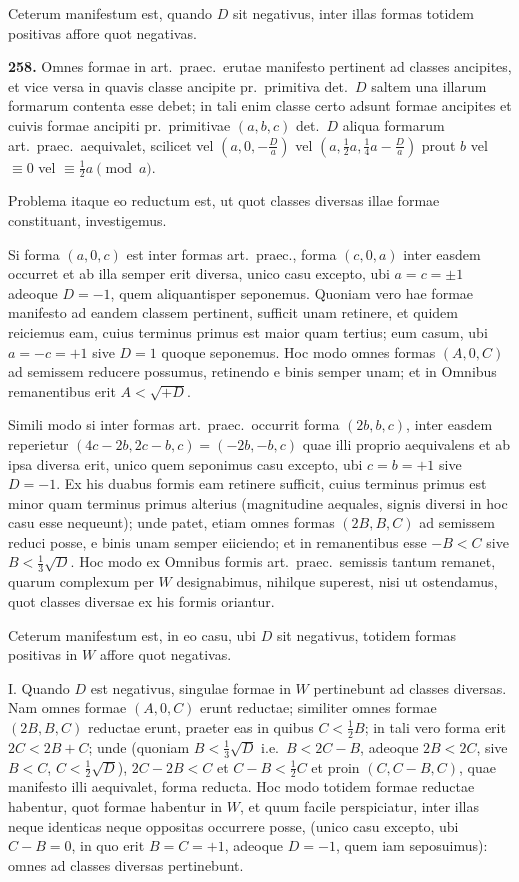 \documentclass[12pt,a4paper]{article}
\theoremstyle{plain}
\theoremstyle{definition}
\theoremstyle{remark}
\theoremstyle{problemstyle}
\begin{document}
Ceterum manifestum est, quando $D$ sit negativus, inter illas formas totidem positivas affore quot negativas.


\textbf{258.} Omnes formae in art.\ praec.\ erutae manifesto pertinent ad classes ancipites, et vice versa in quavis classe ancipite pr.\ primitiva det.\ $D$ saltem una illarum formarum contenta esse debet; in tali enim classe certo adsunt formae ancipites et cuivis formae ancipiti pr.\ primitivae $(a, b, c)$ det.\ $D$ aliqua formarum art.\ praec.\ aequivalet, scilicet vel $(a, 0, -\frac{D}{a})$ vel $(a, \tfrac{1}{2}a, \tfrac{1}{4}a - \frac{D}{a})$ prout $b$ vel $\equiv 0$ vel $\equiv \tfrac{1}{2}a \pmod{a}$.

Problema itaque eo reductum est, ut quot classes diversas illae formae constituant, investigemus.

Si forma $(a, 0, c)$ est inter formas art.\ praec., forma $(c, 0, a)$ inter easdem occurret et ab illa semper erit diversa, unico casu excepto, ubi $a = c = \pm 1$ adeoque $D = -1$, quem aliquantisper seponemus. Quoniam vero hae formae manifesto ad eandem classem pertinent, sufficit unam retinere, et quidem reiciemus eam, cuius terminus primus est maior quam tertius; eum casum, ubi $a = -c = +1$ sive $D = 1$ quoque seponemus. Hoc modo omnes formas $(A, 0, C)$ ad semissem reducere possumus, retinendo e binis semper unam; et in Omnibus remanentibus erit $A < \sqrt{+D}$.

Simili modo si inter formas art.\ praec.\ occurrit forma $(2b, b, c)$, inter easdem reperietur $(4c - 2b, 2c - b, c) = (-2b, -b, c)$ quae illi proprio aequivalens et ab ipsa diversa erit, unico quem seponimus casu excepto, ubi $c = b = +1$ sive $D = -1$. Ex his duabus formis eam retinere sufficit, cuius terminus primus est minor quam terminus primus alterius (magnitudine aequales, signis diversi in hoc casu esse nequeunt); unde patet, etiam omnes formas $(2B, B, C)$ ad semissem reduci posse, e binis unam semper eiiciendo; et in remanentibus esse $-B < C$ sive $B < \tfrac{1}{3}\sqrt{D}$. Hoc modo ex Omnibus formis art.\ praec.\ semissis tantum remanet, quarum complexum per $W$ designabimus, nihilque superest, nisi ut ostendamus, quot classes diversae ex his formis oriantur.

Ceterum manifestum est, in eo casu, ubi $D$ sit negativus, totidem formas positivas in $W$ affore quot negativas.

I. Quando $D$ est negativus, singulae formae in $W$ pertinebunt ad classes diversas. Nam omnes formae $(A, 0, C)$ erunt reductae; similiter omnes formae $(2B, B, C)$ reductae erunt, praeter eas in quibus $C < \tfrac{1}{2}B$; in tali vero forma erit $2C < 2B + C$; unde (quoniam $B < \tfrac{1}{3}\sqrt{D}$ i.e.\ $B < 2C - B$, adeoque $2B < 2C$, sive $B < C$, $C < \tfrac{1}{2}\sqrt{D}$), $2C - 2B < C$ et $C - B < \tfrac{1}{2}C$ et proin $(C, C - B, C)$, quae manifesto illi aequivalet, forma reducta. Hoc modo totidem formae reductae habentur, quot formae habentur in $W$, et quum facile perspiciatur, inter illas neque identicas neque oppositas occurrere posse, (unico casu excepto, ubi $C - B = 0$, in quo erit $B = C = +1$, adeoque $D = -1$, quem iam seposuimus): omnes ad classes diversas pertinebunt.
\end{document}
